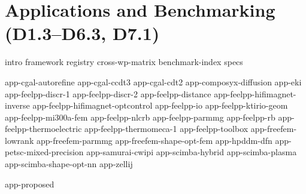 \chapter{Applications and Benchmarking (D1.3--D6.3, D7.1)}
\label{chap:applications}
\label{chap:benchmark-registry} %

{intro}
{framework}
{registry}
{cross-wp-matrix}
{benchmark-index}
{specs}

{app-cgal-autorefine}
{app-cgal-ccdt3}
{app-cgal-cdt2}
{app-composyx-diffusion}
{app-eki}
{app-feelpp-discr-1}
{app-feelpp-discr-2}
{app-feelpp-distance}
{app-feelpp-hifimagnet-inverse}
{app-feelpp-hifimagnet-optcontrol}
{app-feelpp-io}
{app-feelpp-ktirio-geom}
{app-feelpp-mi300a-fem}
{app-feelpp-nlcrb}
{app-feelpp-parmmg}
{app-feelpp-rb}
{app-feelpp-thermoelectric}
{app-feelpp-thermomeca-1}
{app-feelpp-toolbox}
{app-freefem-lowrank}
{app-freefem-parmmg}
{app-freefem-shape-opt-fem}
{app-hpddm-dfn}
{app-petsc-mixed-precision}
{app-samurai-cwipi}
{app-scimba-hybrid}
{app-scimba-plasma}
{app-scimba-shape-opt-nn}
{app-zellij}

{app-proposed}
